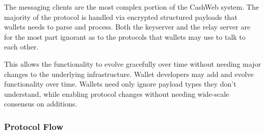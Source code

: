 \documentclass{article}
\begin{document}
The messaging clients are the most complex portion of the CashWeb system. The majority of the protocol is handled via encrypted structured payloads that wallets needs to parse and process. Both the keyserver and the relay server are for the most part ignorant as to the protocols that wallets may use to talk to each other.

This allows the functionality to evolve gracefully over time without needing major changes to the underlying infrastructure. Wallet developers may add and evolve functionality over time. Wallets need only ignore payload types they don't understand, while enabling protocol changes without needing wide-scale consensus on additions.

\subsubsection{Protocol Flow}

\begin{figure}[H]
\centering
{}
\end{figure}

\begin{figure}[H]
\centering
{}
\end{figure}
\end{document}

